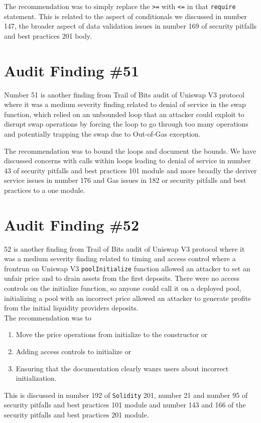 The recommendation was to simply replace the \verb|>=| with \verb|<=| in that \verb|require| statement. This is related to the aspect of conditionals we discussed in number 147, the broader aspect of data validation issues in number 169 of security pitfalls and best practices 201 body.

\section{Audit Finding \#51}

Number 51 is another finding from Trail of Bits audit of Uniswap V3 protocol where it was a medium severity finding related to denial of service in the swap function, which relied on an unbounded loop that an attacker could exploit to disrupt swap operations by forcing the loop to go through too many operations and potentially trapping the swap due to Out-of-Gas exception.

The recommendation was to bound the loops and document the bounds. We have discussed concerns with calls within loops leading to denial of service in number 43 of security pitfalls and best practices 101 module and more broadly the deriver service issues in number 176 and Gas issues in 182 or security pitfalls and best practices to a one module.

\section{Audit Finding \#52}

52 is another finding from Trail of Bits audit of Uniswap V3 protocol where it was a medium severity finding related to timing and access control where a frontrun on Uniswap V3 \verb|poolInitialize| function allowed an attacker to set an unfair price and to drain assets from the first deposits. There were no access controls on the initialize function, so anyone could call it on a deployed pool, initializing a pool with an incorrect price allowed an attacker to generate profits from the initial liquidity providers deposits.\\

The recommendation was to
    \begin{enumerate}
    \item Move the price operations from initialize to the constructor or 
    \item Adding access controls to initialize or
    \item Ensuring that the documentation clearly wanrs users about incorrect initialization.
    \end{enumerate}
This is discussed in number 192 of \verb|Solidity| 201, number 21 and number 95 of security pitfalls and best practices 101 module and number 143 and 166 of the security pitfalls and best practices 201 module.


